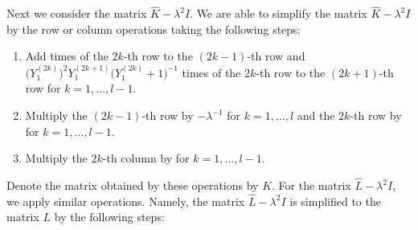 \documentclass[pdftex]{sigma}
\numberwithin{equation}{section}
\begin{document}
Next we consider the matrix $\hat{K}-\lambda^2I$.
We are able to simplify the matrix $\hat{K}-\lambda^2I$ by the row or column operations taking the following steps:
	\begin{enumerate}\itemsep=0pt
		\item Add  times of the $2k$-th row to the $(2k-1)$-th row and $\bigl(Y_1^{(2k)}\bigr)^2Y_1^{(2k+1)}\bigl(Y_1^{(2k)}\!+1\bigr)^{-1}$ times of the $2k$-th row to the $(2k+1)$-th row for $k=1,\dots,l-1$.
		\item Multiply the $(2k-1)$-th row by $-\lambda^{-1}$ for $k=1,\dots,l$ and the $2k$-th row by  for $k=1,\dots,l-1$.
		\item Multiply the $2k$-th column by  for $k=1,\dots,{l-1}$.
	\end{enumerate}
Denote the matrix obtained by these operations by $K$.
For the matrix $\hat{L}-\lambda^2I$, we apply similar operations.
Namely, the matrix $\hat{L}-\lambda^2I$ is simplified to the matrix $L$ by the following steps:
\end{document}
